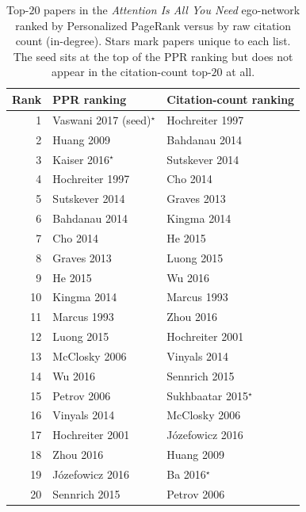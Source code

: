 \documentclass[conference]{IEEEtran}
\begin{document}
\begin{table}[t]
  \centering
  \caption{Top-$20$ papers in the \emph{Attention Is All You
  Need} ego-network ranked by Personalized PageRank versus by
  raw citation count (in-degree). Stars mark papers unique to
  each list. The seed sits at the top of the PPR ranking but
  does not appear in the citation-count top-$20$ at all.}
  \label{tab:rankings}
  \small
  \begin{tabular}{@{}rll@{}}
    \toprule
    Rank & PPR ranking & Citation-count ranking \\
    \midrule
    1  & Vaswani 2017 (seed)$^\star$ & Hochreiter 1997 \\
    2  & Huang 2009                  & Bahdanau 2014 \\
    3  & Kaiser 2016$^\star$         & Sutskever 2014 \\
    4  & Hochreiter 1997             & Cho 2014 \\
    5  & Sutskever 2014              & Graves 2013 \\
    6  & Bahdanau 2014               & Kingma 2014 \\
    7  & Cho 2014                    & He 2015 \\
    8  & Graves 2013                 & Luong 2015 \\
    9  & He 2015                     & Wu 2016 \\
    10 & Kingma 2014                 & Marcus 1993 \\
    11 & Marcus 1993                 & Zhou 2016 \\
    12 & Luong 2015                  & Hochreiter 2001 \\
    13 & McClosky 2006               & Vinyals 2014 \\
    14 & Wu 2016                     & Sennrich 2015 \\
    15 & Petrov 2006                 & Sukhbaatar 2015$^\star$ \\
    16 & Vinyals 2014                & McClosky 2006 \\
    17 & Hochreiter 2001             & Józefowicz 2016 \\
    18 & Zhou 2016                   & Huang 2009 \\
    19 & Józefowicz 2016             & Ba 2016$^\star$ \\
    20 & Sennrich 2015               & Petrov 2006 \\
    \bottomrule
  \end{tabular}
\end{table}
\end{document}
